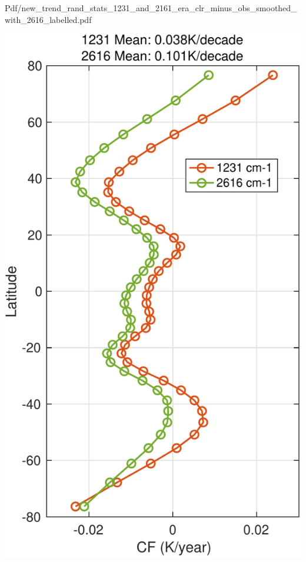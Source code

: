 \documentclass[presentation]{beamer}
\begin{document}
\begin{frame}[label={sec:orgbc040fc}]{Pdf/new\_trend\_rand\_stats\_1231\_and\_2161\_era\_clr\_minus\_obs\_smoothed\_with\_2616\_labelled.pdf}
\begin{center}
\includegraphics[width=0.7\linewidth]{./Figs/Pdf/new_trend_rand_stats_1231_and_2161_era_clr_minus_obs_smoothed_with_2616_labelled.pdf}
\end{center}
\end{frame}
\end{document}
